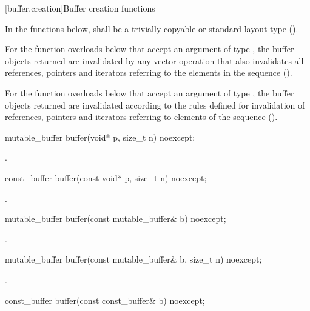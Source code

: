 [buffer.creation]{Buffer creation functions}

\pnum
In the functions below,  shall be a trivially copyable or standard-layout type ().

\pnum
For the function overloads below that accept an argument of type , the buffer objects returned are invalidated by any vector operation that also invalidates all references, pointers and iterators referring to the elements in the sequence ().

\pnum
For the function overloads below that accept an argument of type , the buffer objects returned are invalidated according to the rules defined for invalidation of references, pointers and iterators referring to elements of the sequence ().

%
\begin{itemdecl}
mutable_buffer buffer(void* p, size_t n) noexcept;
\end{itemdecl}

\begin{itemdescr}
\pnum
\returns {}.
\end{itemdescr}

\begin{itemdecl}
const_buffer buffer(const void* p, size_t n) noexcept;
\end{itemdecl}

\begin{itemdescr}
\pnum
\returns {}.
\end{itemdescr}

\begin{itemdecl}
mutable_buffer buffer(const mutable_buffer& b) noexcept;
\end{itemdecl}

\begin{itemdescr}
\pnum
\returns {}.
\end{itemdescr}

\begin{itemdecl}
mutable_buffer buffer(const mutable_buffer& b, size_t n) noexcept;
\end{itemdecl}

\begin{itemdescr}
\pnum
\returns {}.
\end{itemdescr}

\begin{itemdecl}
const_buffer buffer(const const_buffer& b) noexcept;
\end{itemdecl}

